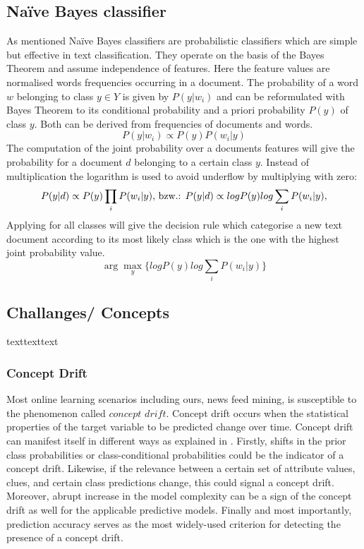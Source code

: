 \documentclass[12pt]{article}
\begin{document}
\subsection{Na\"ive Bayes classifier}

As mentioned Na\"ive Bayes classifiers are probabilistic classifiers which are simple but effective in text classification. They operate on the basis of the Bayes Theorem and assume independence of features. Here the feature values are normalised  words frequencies occurring in a document. The probability of a word $w$ belonging to class $y \in Y$ is given by $P(y|w_i)$ and can be reformulated with Bayes Theorem to its conditional probability and a priori probability $ P(y)$ of class $y$. Both can be derived from frequencies of documents and words.
$$
P(y|w_i) \propto P(y)P(w_i|y)
$$
The computation of the joint probability over a documents features will give the probability for a  document $d$ belonging to a certain class $y$. Instead of multiplication the logarithm is used to avoid underflow by multiplying with zero:
$$
P(y|d) \propto P(y)\prod_i P(w_i|y)\space
\textrm{,  bzw.:    }
P(y|d) \propto log P(y) log \sum_i P(w_i|y),
$$
Applying for all classes will give the decision rule which categorise a new text document according to its most likely class which is the one with the highest joint probability value.
$$
\arg\max_y\{ log P(y) log \sum_i P(w_i|y)\}
$$

\subsection{Challanges/ Concepts}
texttexttext

\subsubsection{Concept Drift}
Most online learning scenarios including ours, news feed mining, is susceptible to the phenomenon called $concept$ $drift$. Concept drift occurs when the statistical properties of the target variable to be predicted change over time. Concept drift can manifest itself in different ways as explained in \citep[p. 5]{KunchevaEnsembleOverview08} . Firstly, shifts in the prior class probabilities or class-conditional probabilities could be the indicator of a concept drift. Likewise, if the relevance between a certain set of attribute values, clues, and certain class predictions change, this could signal a concept drift. Moreover, abrupt increase in the model complexity can be a sign of the concept drift as well for the applicable predictive models. Finally and most importantly, prediction accuracy serves as the most widely-used criterion for detecting the presence of a concept drift. 
\end{document}
